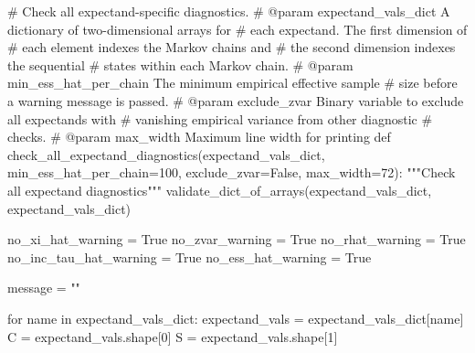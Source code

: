 \documentclass[
  letterpaper,
  DIV=11,
  numbers=noendperiod]{scrartcl}
\newenvironment{Shaded}{\begin{snugshade}}{\end{snugshade}}
\newcommand{\CommentTok}[1]{\textcolor[rgb]{0.37,0.37,0.37}{#1}}
\newcommand{\ControlFlowTok}[1]{\textcolor[rgb]{0.00,0.23,0.31}{#1}}
\newcommand{\DecValTok}[1]{\textcolor[rgb]{0.68,0.00,0.00}{#1}}
\newcommand{\KeywordTok}[1]{\textcolor[rgb]{0.00,0.23,0.31}{#1}}
\newcommand{\NormalTok}[1]{\textcolor[rgb]{0.00,0.23,0.31}{#1}}
\newcommand{\OperatorTok}[1]{\textcolor[rgb]{0.37,0.37,0.37}{#1}}
\newcommand{\StringTok}[1]{\textcolor[rgb]{0.13,0.47,0.30}{#1}}
\newcommand{\VariableTok}[1]{\textcolor[rgb]{0.07,0.07,0.07}{#1}}
\begin{document}
\begin{Shaded}
\begin{Highlighting}[]
\CommentTok{\# Check all expectand{-}specific diagnostics.}
\CommentTok{\# @param expectand\_vals\_dict A dictionary of two{-}dimensional arrays for}
\CommentTok{\#                            each expectand.  The first dimension of}
\CommentTok{\#                            each element indexes the Markov chains and}
\CommentTok{\#                            the second dimension indexes the sequential}
\CommentTok{\#                            states within each Markov chain.}
\CommentTok{\# @param min\_ess\_hat\_per\_chain The minimum empirical effective sample}
\CommentTok{\#                              size before a warning message is passed.}
\CommentTok{\# @param exclude\_zvar Binary variable to exclude all expectands with}
\CommentTok{\#                     vanishing empirical variance from other diagnostic}
\CommentTok{\#                     checks.}
\CommentTok{\# @param max\_width Maximum line width for printing}
\KeywordTok{def}\NormalTok{ check\_all\_expectand\_diagnostics(expectand\_vals\_dict,}
\NormalTok{                                    min\_ess\_hat\_per\_chain}\OperatorTok{=}\DecValTok{100}\NormalTok{,}
\NormalTok{                                    exclude\_zvar}\OperatorTok{=}\VariableTok{False}\NormalTok{,}
\NormalTok{                                    max\_width}\OperatorTok{=}\DecValTok{72}\NormalTok{):}
  \CommentTok{"""Check all expectand diagnostics"""}
\NormalTok{  validate\_dict\_of\_arrays(expectand\_vals\_dict, }\StringTok{\textquotesingle{}expectand\_vals\_dict\textquotesingle{}}\NormalTok{)}

\NormalTok{  no\_xi\_hat\_warning }\OperatorTok{=} \VariableTok{True}
\NormalTok{  no\_zvar\_warning }\OperatorTok{=} \VariableTok{True}
\NormalTok{  no\_rhat\_warning }\OperatorTok{=} \VariableTok{True}
\NormalTok{  no\_inc\_tau\_hat\_warning }\OperatorTok{=} \VariableTok{True}
\NormalTok{  no\_ess\_hat\_warning }\OperatorTok{=} \VariableTok{True}

\NormalTok{  message }\OperatorTok{=} \StringTok{""}

  \ControlFlowTok{for}\NormalTok{ name }\KeywordTok{in}\NormalTok{ expectand\_vals\_dict:}
\NormalTok{    expectand\_vals }\OperatorTok{=}\NormalTok{ expectand\_vals\_dict[name]}
\NormalTok{    C }\OperatorTok{=}\NormalTok{ expectand\_vals.shape[}\DecValTok{0}\NormalTok{]}
\NormalTok{    S }\OperatorTok{=}\NormalTok{ expectand\_vals.shape[}\DecValTok{1}\NormalTok{]}


\end{Highlighting}
\end{Shaded}
\end{document}
